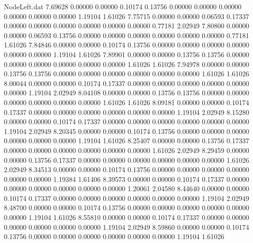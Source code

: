 \begin{filecontents}{NodeLeft.dat}
   7.69628    0.00000    0.00000     0.10174    0.13756    0.00000    0.00000    0.00000    0.00000    0.00000    0.00000    1.19104    1.61026
   7.75715    0.00000    0.00000     0.06593    0.17337    0.00000    0.00000    0.00000    0.00000    0.00000    0.00000    0.77181    2.02949
   7.80800    0.00000    0.00000     0.06593    0.13756    0.00000    0.00000    0.00000    0.00000    0.00000    0.00000    0.77181    1.61026
   7.84846    0.00000    0.00000     0.10174    0.13756    0.00000    0.00000    0.00000    0.00000    0.00000    0.00000    1.19104    1.61026
   7.89901    0.00000    0.00000     0.13756    0.13756    0.00000    0.00000    0.00000    0.00000    0.00000    0.00000    1.61026    1.61026
   7.94978    0.00000    0.00000     0.13756    0.13756    0.00000    0.00000    0.00000    0.00000    0.00000    0.00000    1.61026    1.61026
   8.00044    0.00000    0.00000     0.10174    0.17337    0.00000    0.00000    0.00000    0.00000    0.00000    0.00000    1.19104    2.02949
   8.04108    0.00000    0.00000     0.13756    0.13756    0.00000    0.00000    0.00000    0.00000    0.00000    0.00000    1.61026    1.61026
   8.09181    0.00000    0.00000     0.10174    0.17337    0.00000    0.00000    0.00000    0.00000    0.00000    0.00000    1.19104    2.02949
   8.15280    0.00000    0.00000     0.10174    0.17337    0.00000    0.00000    0.00000    0.00000    0.00000    0.00000    1.19104    2.02949
   8.20345    0.00000    0.00000     0.10174    0.13756    0.00000    0.00000    0.00000    0.00000    0.00000    0.00000    1.19104    1.61026
   8.25407    0.00000    0.00000     0.13756    0.17337    0.00000    0.00000    0.00000    0.00000    0.00000    0.00000    1.61026    2.02949
   8.29459    0.00000    0.00000     0.13756    0.17337    0.00000    0.00000    0.00000    0.00000    0.00000    0.00000    1.61026    2.02949
   8.34513    0.00000    0.00000     0.10174    0.13756    0.00000    0.00000    0.00000    0.00000    0.00000    0.00000    1.19384    1.61406
   8.39573    0.00000    0.00000     0.10174    0.17337    0.00000    0.00000    0.00000    0.00000    0.00000    0.00000    1.20061    2.04580
   8.44640    0.00000    0.00000     0.10174    0.17337    0.00000    0.00000    0.00000    0.00000    0.00000    0.00000    1.19104    2.02949
   8.48700    0.00000    0.00000     0.10174    0.13756    0.00000    0.00000    0.00000    0.00000    0.00000    0.00000    1.19104    1.61026
   8.55810    0.00000    0.00000     0.10174    0.17337    0.00000    0.00000    0.00000    0.00000    0.00000    0.00000    1.19104    2.02949
   8.59860    0.00000    0.00000     0.10174    0.13756    0.00000    0.00000    0.00000    0.00000    0.00000    0.00000    1.19104    1.61026

\end{filecontents}
